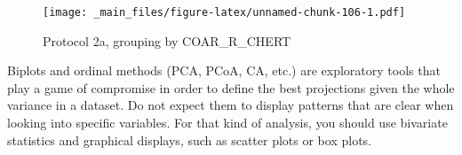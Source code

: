 \documentclass[12pt,]{book}
\newenvironment{Shaded}{\begin{snugshade}}{\end{snugshade}}
\newcommand{\DataTypeTok}[1]{\textcolor[rgb]{0.13,0.29,0.53}{#1}}
\newcommand{\DecValTok}[1]{\textcolor[rgb]{0.00,0.00,0.81}{#1}}
\newcommand{\FloatTok}[1]{\textcolor[rgb]{0.00,0.00,0.81}{#1}}
\newcommand{\KeywordTok}[1]{\textcolor[rgb]{0.13,0.29,0.53}{\textbf{#1}}}
\newcommand{\NormalTok}[1]{#1}
\newcommand{\OperatorTok}[1]{\textcolor[rgb]{0.81,0.36,0.00}{\textbf{#1}}}
\newcommand{\StringTok}[1]{\textcolor[rgb]{0.31,0.60,0.02}{#1}}
\begin{document}
\begin{Shaded}
\end{Shaded}

\begin{figure}
\centering
\texttt{[image: \_main\_files/figure-latex/unnamed-chunk-106-1.pdf]}
\caption{\label{fig:unnamed-chunk-106}Protocol 2a, grouping by COAR\_R\_CHERT}
\end{figure}

Biplots and ordinal methods (PCA, PCoA, CA, etc.) are exploratory tools that play a game of compromise in order to define the best projections given the whole variance in a dataset. Do not expect them to display patterns that are clear when looking into specific variables. For that kind of analysis, you should use bivariate statistics and graphical displays, such as scatter plots or box plots.
\end{document}
